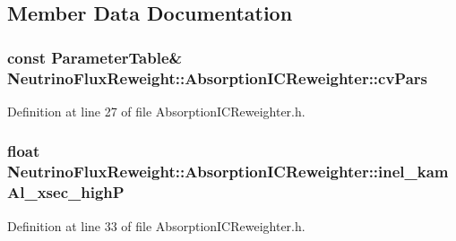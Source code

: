 \subsection{Member Data Documentation}
\hypertarget{class_neutrino_flux_reweight_1_1_absorption_i_c_reweighter_a48bef225244e591385f084f20ce4c267}{
\subsubsection[{cv\-Pars}]{\setlength{\rightskip}{0pt plus 5cm}const {\bf Parameter\-Table}\& Neutrino\-Flux\-Reweight\-::\-Absorption\-I\-C\-Reweighter\-::cv\-Pars}}\label{class_neutrino_flux_reweight_1_1_absorption_i_c_reweighter_a48bef225244e591385f084f20ce4c267}


Definition at line 27 of file Absorption\-I\-C\-Reweighter.\-h.

\hypertarget{class_neutrino_flux_reweight_1_1_absorption_i_c_reweighter_a216cbaf9abd19f100ed5444b7a11011d}{
\subsubsection[{inel\-\_\-kam\-Al\-\_\-xsec\-\_\-high\-P}]{\setlength{\rightskip}{0pt plus 5cm}float Neutrino\-Flux\-Reweight\-::\-Absorption\-I\-C\-Reweighter\-::inel\-\_\-kam\-Al\-\_\-xsec\-\_\-high\-P\hspace{0.3cm}{\ttfamily [private]}}}\label{class_neutrino_flux_reweight_1_1_absorption_i_c_reweighter_a216cbaf9abd19f100ed5444b7a11011d}


Definition at line 33 of file Absorption\-I\-C\-Reweighter.\-h.

